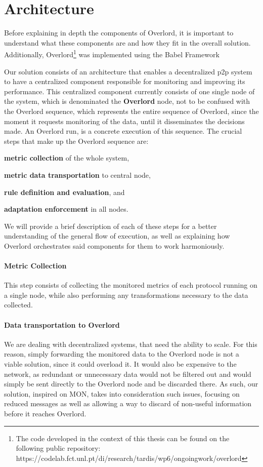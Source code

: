 \section{Architecture}
\label{sec:architecture}

Before explaining in depth the components of Overlord, it is important to understand what these components are and how they fit in the overall solution. Additionally, Overlord\footnote{The code developed in the context of this thesis can be found on the following public repository: https://codelab.fct.unl.pt/di/research/tardis/wp6/ongoingwork/overlord} was implemented using the Babel Framework\cite{Fouto2022}

Our solution consists of an architecture that enables a decentralized \gls{p2p} system to have a centralized component responsible for monitoring and improving its performance. This centralized component currently consists of one single node of the system, which is denominated the \textbf{Overlord} node, not to be confused with the Overlord sequence, which represents the entire sequence of Overlord, since the moment it requests monitoring of the data, until it disseminates the decisions made. An Overlord run, is a concrete execution of this sequence. The crucial steps that make up the Overlord sequence are:
\begin{inparaenum}[(1)]
	\item \textbf{metric collection} of the whole system,
	\item \textbf{metric data transportation} to central node,
	\item \textbf{rule definition and evaluation}, and
	\item \textbf{adaptation enforcement} in all nodes.
\end{inparaenum}
We will provide a brief description of each of these steps for a better understanding of the general flow of execution, as well as explaining how Overlord orchestrates said components for them to work harmoniously.

\paragraph{Metric Collection} This step consists of collecting the monitored metrics of each protocol running on a single node, while also performing any transformations necessary to the data collected.

\paragraph{Data transportation to Overlord} We are dealing with decentralized systems, that need the ability to scale. For this reason, simply forwarding the monitored data to the Overlord node is not a viable solution, since it could overload it. It would also be expensive to the network, as redundant or unnecessary data would not be filtered out and would simply be sent directly to the Overlord node and be discarded there. As such, our solution, inspired on MON\cite{Liang2005}, takes into consideration such issues, focusing on reduced messages as well as allowing a way to discard of non-useful information before it reaches Overlord.

